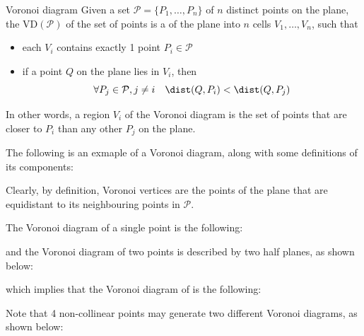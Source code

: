 \documentclass[a4paper, 12pt]{report}
\begin{document}
    \begin{frameddefn}{Voronoi diagram}
        Given a set $\mathcal P = \{P_1, \ldots, P_n\}$ of $n$ distinct points on the plane, the  $\mathrm{VD}(\mathcal P)$ of the set of points is a  of the plane into $n$ cells $V_1, \ldots, V_n$, such that

        \begin{itemize}
            \item each $V_i$ contains exactly 1 point $P_i \in \mathcal P$
            \item if a point $Q$ on the plane lies in $V_i$, then $$\forall P_j \in \mathcal P, j \neq i \quad \dist(Q, P_i) < \dist(Q, P_j)$$
        \end{itemize}
    \end{frameddefn}

    In other words, a region $V_i$ of the Voronoi diagram is the set of points that are closer to $P_i$ than any other $P_j$ on the plane.

    \begin{example}
        The following is an exmaple of a Voronoi diagram, along with some definitions of its components:

    \end{example}

    Clearly, by definition, Voronoi vertices are the points of the plane that are equidistant to its neighbouring points in $\mathcal P$.


    The Voronoi diagram of a single point is the following:


    and the Voronoi diagram of two points is described by two half planes, as shown below:


    which implies that the Voronoi diagram of  is the following:


    Note that 4 non-collinear points may generate two different Voronoi diagrams, as shown below:
\end{document}
